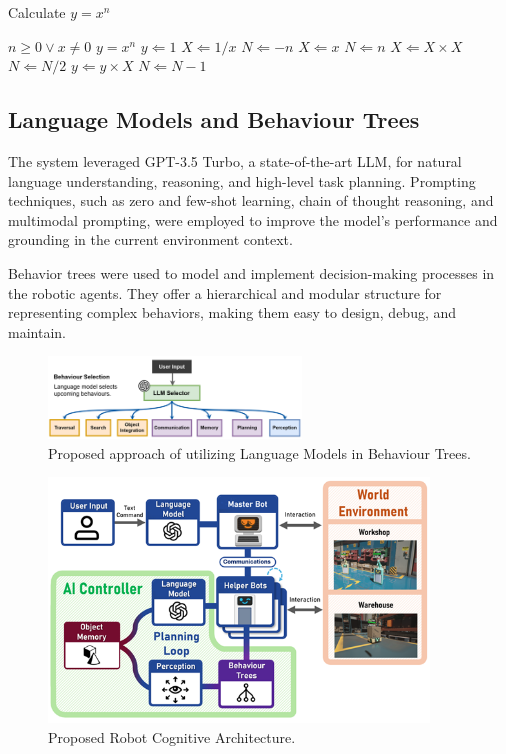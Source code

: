 \documentclass[pdflatex,sn-mathphys-num]{sn-jnl}%
\theoremstyle{thmstyleone}%
\theoremstyle{thmstyletwo}%
\theoremstyle{thmstylethree}%
\begin{document}
\begin{algorithm}
\caption{Calculate $y = x^n$}\label{algo1}
\begin{algorithmic}[1]
\Require $n \geq 0 \vee x \neq 0$
\Ensure $y = x^n$ 
\State $y \Leftarrow 1$
\label{algln2}
        \State $X \Leftarrow 1 / x$
        \State $N \Leftarrow -n$
\Else
        \State $X \Leftarrow x$
        \State $N \Leftarrow n$
\EndIf
{}
            \State $X \Leftarrow X \times X$
            \State $N \Leftarrow N / 2$
        \Else[$N$ is odd]
            \State $y \Leftarrow y \times X$
            \State $N \Leftarrow N - 1$
        \EndIf
\EndWhile
\end{algorithmic}
\end{algorithm}

\subsection{Language Models and Behaviour Trees}
The system leveraged GPT-3.5 Turbo, a state-of-the-art LLM, for natural language understanding, reasoning, and high-level task planning. Prompting techniques, such as zero and few-shot learning, chain of thought reasoning, and multimodal prompting, were employed to improve the model's performance and grounding in the current environment context.

Behavior trees were used to model and implement decision-making processes in the robotic agents. They offer a hierarchical and modular structure for representing complex behaviors, making them easy to design, debug, and maintain.


\begin{figure}[h]
\centering
\includegraphics[width=0.6\textwidth]{figures/Picture12.png}
\caption{Proposed approach of utilizing Language Models in Behaviour Trees.}\label{fig7}
\end{figure}

\begin{figure}[h]
\centering
\includegraphics[width=0.9\textwidth]{figures/Picture5.png}
\caption{Proposed Robot Cognitive Architecture.}\label{fig8}
\end{figure}
\end{document}
